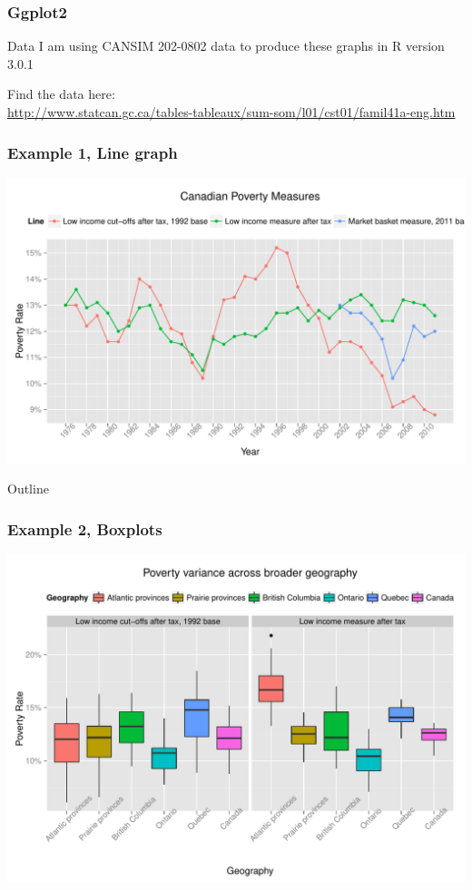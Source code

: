 \documentclass[nogin]{beamer}\usepackage[]{graphicx}\usepackage[]{color}
\makeatletter
\def\maxwidth{ %
  \ifdim\Gin@nat@width>\linewidth
    \linewidth
  \else
    \Gin@nat@width
  \fi
}
\newenvironment{knitrout}{}{} %
\makeatother
\begin{document}
\begin{frame}
\frametitle{Ggplot2}
\begin{block}{Data}
I am using CANSIM 202-0802 data to produce these graphs in R version 3.0.1
\end{block}
Find the data here:\\
\url{http://www.statcan.gc.ca/tables-tableaux/sum-som/l01/cst01/famil41a-eng.htm}
\end{frame}

\begin{frame}[fragile]
\frametitle{Example 1, Line graph}
\begin{knitrout}
\color{fgcolor}
\includegraphics[width=\maxwidth]{figure/unnamed-chunk-1} 

\end{knitrout}

\end{frame}

\begin{frame}[fragile]{Outline}
\frametitle{Example 2, Boxplots}
\begin{knitrout}
\color{fgcolor}
\includegraphics[width=\maxwidth]{figure/unnamed-chunk-2} 

\end{knitrout}

\end{frame}
\end{document}

